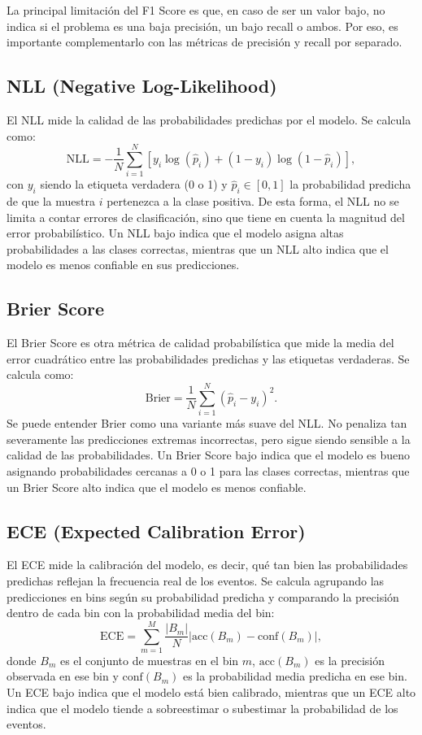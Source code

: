 \documentclass{article}
\begin{document}
\begin{appendix}
    La principal limitación del F1 Score es que, en caso de ser un valor bajo, no indica si el problema es una baja precisión, un bajo recall o ambos. Por eso, es importante complementarlo con las métricas de precisión y recall por separado.

    \subsection{NLL (Negative Log-Likelihood)}

    El NLL mide la calidad de las probabilidades predichas por el modelo. Se calcula como:
    \[
        \text{NLL} = -\frac{1}{N} \sum_{i=1}^N \left[ y_i \log(\hat{p}_i) + (1 - y_i) \log(1 - \hat{p}_i) \right],
    \]
    con \( y_i \) siendo la etiqueta verdadera (0 o 1) y \( \hat{p}_i \in [0,1] \) la probabilidad predicha de que la muestra \( i \) pertenezca a la clase positiva. De esta forma, el NLL no se limita a contar errores de clasificación, sino que tiene en cuenta la magnitud del error probabilístico. Un NLL bajo indica que el modelo asigna altas probabilidades a las clases correctas, mientras que un NLL alto indica que el modelo es menos confiable en sus predicciones.

    \subsection{Brier Score}

    El Brier Score es otra métrica de calidad probabilística que mide la media del error cuadrático entre las probabilidades predichas y las etiquetas verdaderas. Se calcula como:
    \[
        \text{Brier} = \frac{1}{N} \sum_{i=1}^N (\hat{p}_i - y_i)^2.
    \]
    Se puede entender Brier como una variante más suave del NLL. No penaliza tan severamente las predicciones extremas incorrectas, pero sigue siendo sensible a la calidad de las probabilidades. Un Brier Score bajo indica que el modelo es bueno asignando probabilidades cercanas a 0 o 1 para las clases correctas, mientras que un Brier Score alto indica que el modelo es menos confiable.

    \subsection{ECE (Expected Calibration Error)}

    El ECE mide la calibración del modelo, es decir, qué tan bien las probabilidades predichas reflejan la frecuencia real de los eventos. Se calcula agrupando las predicciones en bins según su probabilidad predicha y comparando la precisión dentro de cada bin con la probabilidad media del bin:
    \[
        \text{ECE} = \sum_{m=1}^M \frac{|B_m|}{N} |\text{acc}(B_m) - \text{conf}(B_m)|,
    \]
    donde \( B_m \) es el conjunto de muestras en el bin \( m \), \( \text{acc}(B_m) \) es la precisión observada en ese bin y \( \text{conf}(B_m) \) es la probabilidad media predicha en ese bin. Un ECE bajo indica que el modelo está bien calibrado, mientras que un ECE alto indica que el modelo tiende a sobreestimar o subestimar la probabilidad de los eventos.


\end{appendix}
\end{document}
